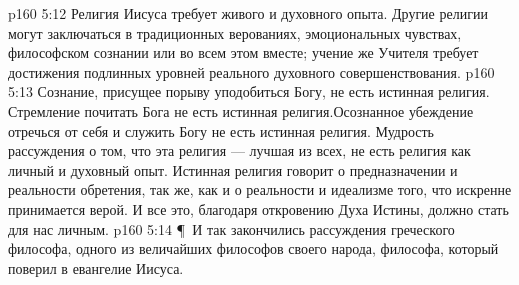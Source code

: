 \vs p160 5:12 Религия Иисуса требует живого и духовного опыта. Другие религии могут заключаться в традиционных верованиях, эмоциональных чувствах, философском сознании или во всем этом вместе; учение же Учителя требует достижения подлинных уровней реального духовного совершенствования.
\vs p160 5:13 Сознание, присущее порыву уподобиться Богу, не есть истинная религия. Стремление почитать Бога не есть истинная религия.Осознанное убеждение отречься от себя и служить Богу не есть истинная религия. Мудрость рассуждения о том, что эта религия --- лучшая из всех, не есть религия как личный и духовный опыт. Истинная религия говорит о предназначении и реальности обретения, так же, как и о реальности и идеализме того, что искренне принимается верой. И все это, благодаря откровению Духа Истины, должно стать для нас личным.
\vs p160 5:14 \P\ И так закончились рассуждения греческого философа, одного из величайших философов своего народа, философа, который поверил в евангелие Иисуса.

